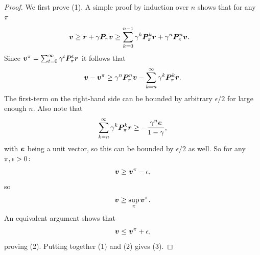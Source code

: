 \begin{frame}
{\begin{proof}
      We first prove (1). A simple proof by induction over $n$ %
      shows that for any $\pi$
      \begin{align*}
        \val
        &\geq
        \vreward + \disc \trans_\pol \val
        \geq
        \sum_{k=0}^{n-1}\disc^k\trans_\pol^k\vreward
        + \disc^n \trans_\pol^n \val.
      \end{align*}
      Since $\val^\pol = \sum_{t=0}^\infty \disc^t \trans^t_\pol \vreward$ it follows that
      \[
      \val - \val^\pol 
      \geq
      \disc^n \trans_\pol^n \val
      -\sum_{k=n}^{\infty}\disc^k\trans_\pol^k\vreward.
      \]
      The first-term on the right-hand side can be bounded by arbitrary $\epsilon/2$ for large enough $n$. Also note that %
      \[
      \sum_{k=n}^{\infty}\disc^k\trans_\pol^k\vreward \geq -\frac{\disc^n \vectorsym{e}}{1 - \disc},
      \]
      with $\vectorsym{e}$ being a unit vector, so this can be bounded by $\epsilon/2$ as well. So for any $\pi, \epsilon > 0$:
      \[
      \val \geq \val^\pol - \epsilon,
      \]
      so
      \[
      \val \geq \sup_\pol \val^\pol.
      \]
      An equivalent argument shows that
      \[
      \val \leq \val^\pol + \epsilon,
      \]
      proving (2).
      Putting together (1) and (2) gives (3).
    \end{proof}
  }
\end{frame}


